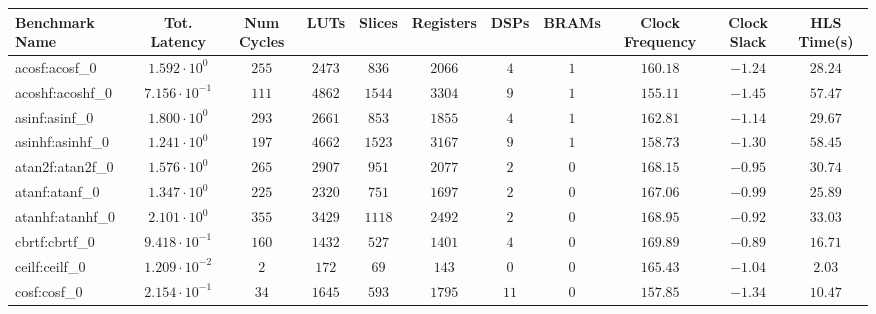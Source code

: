 \begin{tabular}{|l|c|c|c|c|c|c|c|c|c|c|}
\hline
Benchmark Name               & Tot. Latency            & Num Cycles & LUTs      & Slices    & Registers & DSPs    & BRAMs & Clock Frequency & Clock Slack & HLS Time(s) \\
\hline
acosf:acosf\_0               & $ 1.592 \cdot 10^{0}  $ & $ 255    $ & $ 2473  $ & $ 836   $ & $ 2066  $ & $ 4   $ & $ 1 $ & $ 160.18      $ & $ -1.24   $ & $ 28.24   $ \\
acoshf:acoshf\_0             & $ 7.156 \cdot 10^{-1} $ & $ 111    $ & $ 4862  $ & $ 1544  $ & $ 3304  $ & $ 9   $ & $ 1 $ & $ 155.11      $ & $ -1.45   $ & $ 57.47   $ \\
asinf:asinf\_0               & $ 1.800 \cdot 10^{0}  $ & $ 293    $ & $ 2661  $ & $ 853   $ & $ 1855  $ & $ 4   $ & $ 1 $ & $ 162.81      $ & $ -1.14   $ & $ 29.67   $ \\
asinhf:asinhf\_0             & $ 1.241 \cdot 10^{0}  $ & $ 197    $ & $ 4662  $ & $ 1523  $ & $ 3167  $ & $ 9   $ & $ 1 $ & $ 158.73      $ & $ -1.30   $ & $ 58.45   $ \\
atan2f:atan2f\_0             & $ 1.576 \cdot 10^{0}  $ & $ 265    $ & $ 2907  $ & $ 951   $ & $ 2077  $ & $ 2   $ & $ 0 $ & $ 168.15      $ & $ -0.95   $ & $ 30.74   $ \\
atanf:atanf\_0               & $ 1.347 \cdot 10^{0}  $ & $ 225    $ & $ 2320  $ & $ 751   $ & $ 1697  $ & $ 2   $ & $ 0 $ & $ 167.06      $ & $ -0.99   $ & $ 25.89   $ \\
atanhf:atanhf\_0             & $ 2.101 \cdot 10^{0}  $ & $ 355    $ & $ 3429  $ & $ 1118  $ & $ 2492  $ & $ 2   $ & $ 0 $ & $ 168.95      $ & $ -0.92   $ & $ 33.03   $ \\
cbrtf:cbrtf\_0               & $ 9.418 \cdot 10^{-1} $ & $ 160    $ & $ 1432  $ & $ 527   $ & $ 1401  $ & $ 4   $ & $ 0 $ & $ 169.89      $ & $ -0.89   $ & $ 16.71   $ \\
ceilf:ceilf\_0               & $ 1.209 \cdot 10^{-2} $ & $ 2      $ & $ 172   $ & $ 69    $ & $ 143   $ & $ 0   $ & $ 0 $ & $ 165.43      $ & $ -1.04   $ & $ 2.03    $ \\
cosf:cosf\_0                 & $ 2.154 \cdot 10^{-1} $ & $ 34     $ & $ 1645  $ & $ 593   $ & $ 1795  $ & $ 11  $ & $ 0 $ & $ 157.85      $ & $ -1.34   $ & $ 10.47   $ \\

\end{tabular}
